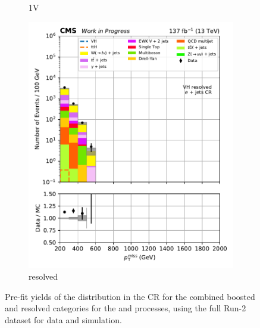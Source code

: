 \begin{figure}[htbp]
\begin{subfigure}[b]{0.24\textwidth}
        \caption{\VH 1V}
    \end{subfigure}
    \hfill
    \begin{subfigure}[b]{0.24\textwidth}
        \includegraphics[width=\textwidth]{figures/region_plots/full_Run2/region_3/VH_resolved.pdf}
        \caption{\VH resolved}
    \end{subfigure}
    \caption[Pre-fit yields of the \ptmiss distribution in the \singleEleCr control region for the combined boosted and resolved categories for the \ttH and \VH processes, using the full Run-2 dataset for data and simulation]{Pre-fit yields of the \ptmiss distribution in the \singleEleCr \gls{CR} for the combined boosted and resolved categories for the \ttH and \VH processes, using the full Run-2 dataset for data and simulation.}
    \label{fig:htoinv_cr_yields_comb2016to18_single_electron}
\end{figure}

